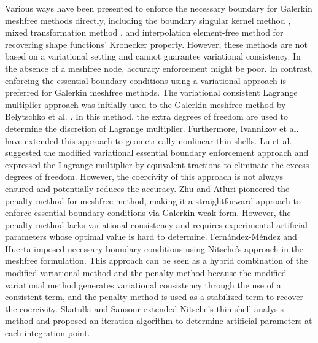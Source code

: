 Various ways have been presented to enforce the necessary boundary for Galerkin meshfree methods directly, including the boundary singular kernel method \cite{chen2000a}, mixed transformation method  \cite{chen2000a}, and interpolation element-free method \cite{liu2019a} for recovering shape functions’ Kronecker property. However, these methods are not based on a variational setting and cannot guarantee variational consistency. In the absence of a meshfree node, accuracy enforcement might be poor. In contrast, enforcing the essential boundary conditions using a variational approach is preferred for Galerkin meshfree methods. The variational consistent Lagrange multiplier approach was initially used to the Galerkin meshfree method by Belytschko et al. \cite{belytschko1994}. In this method, the extra degrees of freedom are used to determine the discretion of Lagrange multiplier. Furthermore, Ivannikov et al. \cite{ivannikov2014a} have extended this approach to geometrically nonlinear thin shells. Lu et al. \cite{lu1994} suggested the modified variational essential boundary enforcement approach and expressed the Lagrange multiplier by equivalent tractions to eliminate the excess degrees of freedom. However, the coercivity of this approach is not always ensured and potentially reduces the accuracy. Zhu and Atluri \cite{zhu1998} pioneered the penalty method for meshfree method, making it a straightforward approach to enforce essential boundary conditions via Galerkin weak form. However, the penalty method lacks variational consistency and requires experimental artificial parameters whose optimal value is hard to determine. Fernández-Méndez and Huerta \cite{fernandez-mendez2004} imposed necessary boundary conditions using Nitsche's approach in the meshfree formulation. This approach can be seen as a hybrid combination of the modified variational method and the penalty method because the modified variational method generates variational consistency through the use of a consistent term, and the penalty method is used as a stabilized term to recover the coercivity. Skatulla and Sansour \cite{skatulla2008} extended Nitsche’s thin shell analysis method and proposed an iteration algorithm to determine artificial parameters at each integration point.

